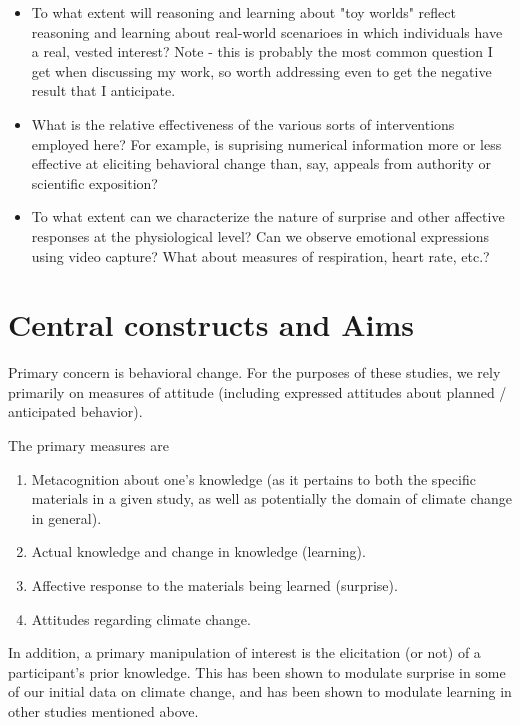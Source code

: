 \begin{itemize}
    \item To what extent will reasoning and learning about "toy worlds" reflect
        reasoning and learning about real-world scenarioes in which individuals
        have a real, vested interest? Note - this is probably the most common
        question I get when discussing my work, so worth addressing even to get
        the negative result that I anticipate.
    \item What is the relative effectiveness of the various sorts of
        interventions employed here? For example, is suprising numerical
        information more or less effective at eliciting behavioral change than,
        say, appeals from authority or scientific exposition?
    \item To what extent can we characterize the nature of surprise and other
        affective responses at the physiological level? Can we observe emotional
        expressions using video capture? What about measures of respiration,
        heart rate, etc.?
\end{itemize}

\section{Central constructs and Aims}

Primary concern is behavioral change. For the purposes of these studies, we rely
primarily on measures of attitude (including expressed attitudes about planned /
anticipated behavior).

The primary measures are 

\begin{enumerate}
    \item Metacognition about one's knowledge (as it pertains to both the
        specific materials in a given study, as well as potentially the domain
        of climate change in general).
    \item Actual knowledge and change in knowledge (learning).
    \item Affective response to the materials being learned (surprise).
    \item Attitudes regarding climate change.
\end{enumerate}

In addition, a primary manipulation of interest is the elicitation (or not) of a
participant's prior knowledge. This has been shown to modulate surprise in some
of our initial data on climate change, and has been shown to modulate learning
in other studies mentioned above.

